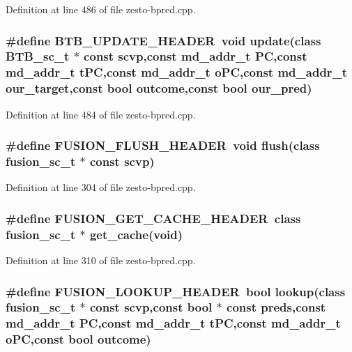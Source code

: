 Definition at line 486 of file zesto-bpred.cpp.
\subsubsection[{BTB\_\-UPDATE\_\-HEADER}]{\setlength{\rightskip}{0pt plus 5cm}\#define BTB\_\-UPDATE\_\-HEADER~void update(class {\bf BTB\_\-sc\_\-t} $\ast$ const scvp,const {\bf md\_\-addr\_\-t} PC,const {\bf md\_\-addr\_\-t} tPC,const {\bf md\_\-addr\_\-t} oPC,const {\bf md\_\-addr\_\-t} our\_\-target,const bool outcome,const bool our\_\-pred)}\label{zesto-bpred_8cpp_2c8a36f1476f6d80652d47e62a913993}




Definition at line 484 of file zesto-bpred.cpp.
\subsubsection[{FUSION\_\-FLUSH\_\-HEADER}]{\setlength{\rightskip}{0pt plus 5cm}\#define FUSION\_\-FLUSH\_\-HEADER~void flush(class {\bf fusion\_\-sc\_\-t} $\ast$ const scvp)}\label{zesto-bpred_8cpp_e59fd0a867dbb4a33469182b8de58f43}




Definition at line 304 of file zesto-bpred.cpp.
\subsubsection[{FUSION\_\-GET\_\-CACHE\_\-HEADER}]{\setlength{\rightskip}{0pt plus 5cm}\#define FUSION\_\-GET\_\-CACHE\_\-HEADER~class {\bf fusion\_\-sc\_\-t} $\ast$ get\_\-cache(void)}\label{zesto-bpred_8cpp_eabf066c308addafb45eeb95c89e11c0}




Definition at line 310 of file zesto-bpred.cpp.
\subsubsection[{FUSION\_\-LOOKUP\_\-HEADER}]{\setlength{\rightskip}{0pt plus 5cm}\#define FUSION\_\-LOOKUP\_\-HEADER~bool lookup(class {\bf fusion\_\-sc\_\-t} $\ast$ const scvp,const bool $\ast$ const preds,const {\bf md\_\-addr\_\-t} PC,const {\bf md\_\-addr\_\-t} tPC,const {\bf md\_\-addr\_\-t} oPC,const bool outcome)}\label{zesto-bpred_8cpp_fd52998f3f7ab32d5e430aadd9b971e6}




